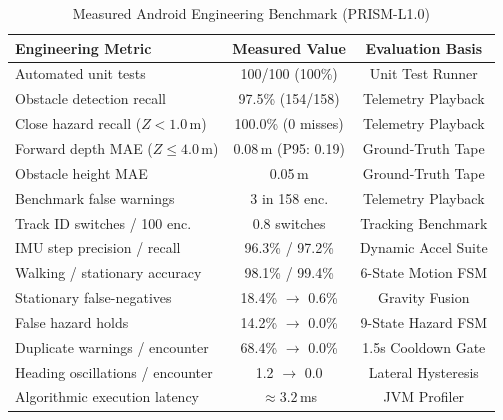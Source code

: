 \begin{table}[!t]
\caption{Measured Android Engineering Benchmark (PRISM-L1.0)}
\label{tab:engineering_results}
\centering
\scriptsize
\setlength{\tabcolsep}{2.5pt}
\begin{tabularx}{\columnwidth}{X c c}
\toprule
\textbf{Engineering Metric} & \textbf{Measured Value} & \textbf{Evaluation Basis} \\
\midrule
Automated unit tests                 & 100/100 (100\%)     & Unit Test Runner \\
Obstacle detection recall            & 97.5\% (154/158)    & Telemetry Playback \\
Close hazard recall ($Z < 1.0$\,m)   & 100.0\% (0 misses)  & Telemetry Playback \\
Forward depth MAE ($Z \le 4.0$\,m)   & 0.08\,m (P95: 0.19) & Ground-Truth Tape \\
Obstacle height MAE                  & 0.05\,m             & Ground-Truth Tape \\
Benchmark false warnings             & 3 in 158 enc.       & Telemetry Playback \\
Track ID switches / 100 enc.         & 0.8 switches        & Tracking Benchmark \\
IMU step precision / recall          & 96.3\% / 97.2\%     & Dynamic Accel Suite \\
Walking / stationary accuracy        & 98.1\% / 99.4\%     & 6-State Motion FSM \\
Stationary false-negatives           & 18.4\% $\to$ 0.6\%  & Gravity Fusion \\
False hazard holds                   & 14.2\% $\to$ 0.0\%  & 9-State Hazard FSM \\
Duplicate warnings / encounter       & 68.4\% $\to$ 0.0\%  & 1.5s Cooldown Gate \\
Heading oscillations / encounter     & 1.2 $\to$ 0.0       & Lateral Hysteresis \\
Algorithmic execution latency        & $\approx 3.2$\,ms   & JVM Profiler \\
\bottomrule
\end{tabularx}
\par{}
\end{table}
